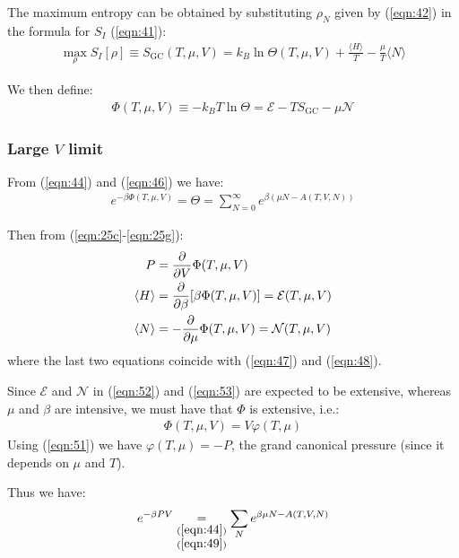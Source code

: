 \documentclass[../../main.tex]{subfiles}
\begin{document}
\medskip

The maximum entropy can be obtained by substituting $\rho_N$ given by (\ref{eqn:42}) in the formula for $S_I$ (\ref{eqn:41}):
\begin{align*}
    \max_\rho S_I[\rho] \equiv S_{\mathrm{GC}}(T, \mu, V) = k_B \ln \Theta(T, \mu, V) + \frac{\langle H \rangle}{T} - \frac{\mu}{T} \langle N \rangle  
\end{align*}

We then define: %
\begin{align}
    \label{eqn:49}
    \Phi(T, \mu, V) \equiv -k_B T \ln \Theta = \mathcal{E}- T S_{\mathrm{GC}} - \mu \mathcal{N}
\end{align}

\subsubsection{Large $V$ limit}
From (\ref{eqn:44}) and (\ref{eqn:46}) we have:
\begin{align}\label{eqn:50}
    e^{-\beta \Phi(T, \mu, V)} = \Theta = \sum_{N=0}^\infty e^{\beta(\mu N - A (T, V, N))}
\end{align}

Then from (\ref{eqn:25c}-\ref{eqn:25g}):
\begin{align}
    P &= \pdv{V} \Phi(T, \mu, V) \label{eqn:51}\\
    \langle H \rangle &= \pdv{\beta} [\beta \Phi(T, \mu, V)] = \mathcal{E}(T, \mu, V) \label{eqn:52}\\
    \langle N \rangle &= - \pdv{\mu} \Phi(T, \mu, V) = \mathcal{N}(T, \mu, V) \label{eqn:53}
\end{align}
where the last two equations coincide with (\ref{eqn:47}) and (\ref{eqn:48}).

\medskip

Since $\mathcal{E}$ and $\mathcal{N}$ in (\ref{eqn:52}) and (\ref{eqn:53}) are expected to be extensive, whereas $\mu$ and $\beta$ are intensive, we must have that $\Phi$ is extensive, i.e.:
\begin{align}\label{eqn:54}
    \Phi(T, \mu, V) = V \varphi(T, \mu)
\end{align}
Using (\ref{eqn:51}) we have $\varphi(T, \mu) = - P$, the grand canonical pressure (since it depends on $\mu$ and $T$). 

Thus we have:
\begin{align}\label{eqn:55}
    e^{-\beta PV} \underset{\substack{(\ref{eqn:44})\\(\ref{eqn:49})}}{=} \sum_N e^{\beta \mu N - A(T, V, N)}
\end{align}
\end{document}
